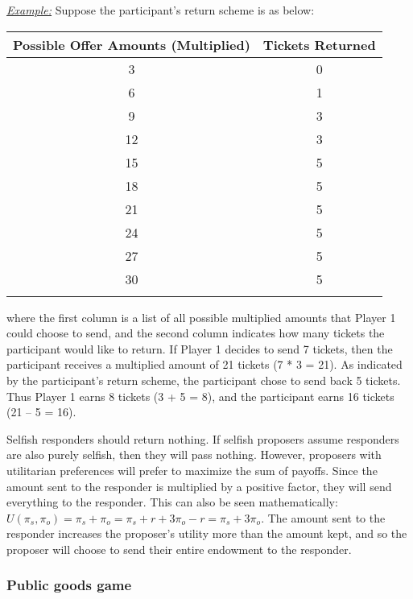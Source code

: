 \documentclass[12pt]{article}
\begin{document}
\underline{\textit{Example:}} Suppose the participant\rq s return scheme is as below: \\

\begin{center}
\begin{tabular}{ c c }
\hline \hline
 Possible Offer Amounts (Multiplied) & Tickets Returned \\ 
 \hline
3 & 0  \\  
6 & 1 \\  
9 & 3  \\  
12 & 3  \\  
15 & 5   \\  
18 & 5  \\  
21 & 5 \\  
24 & 5 \\  
27 & 5 \\  
30 & 5 \\  
\hline \hline \\
\end{tabular}
\end{center} 


\noindent where the first column is a list of all possible multiplied amounts that Player 1 could choose to send, and the second column indicates how many tickets the participant would like to return. If Player 1 decides to send 7 tickets, then the participant receives a multiplied amount of 21 tickets (7 * 3 = 21). As indicated by the participant\rq s return scheme, the participant chose to send back 5 tickets. Thus Player 1 earns 8 tickets (3 + 5 =  8), and the participant earns 16 tickets (21 -- 5 = 16).

Selfish responders should return nothing. If selfish proposers assume responders are also purely selfish, then they will pass nothing. However, proposers with utilitarian preferences will prefer to maximize the sum of payoffs. Since the amount sent to the responder is multiplied by a positive factor, they will send everything to the responder. This can also be seen mathematically: \(U(\pi_{s}, \pi_{o}) = \pi_{s} + \pi_{o} = \pi_{s} + r + 3\pi_{o} - r = \pi_{s} + 3\pi_{o} \). The amount sent to the responder increases the proposer\rq s utility more than the amount kept, and so the proposer will choose to send their entire endowment to the responder.
	
\subsubsection{Public goods game}
\end{document}

